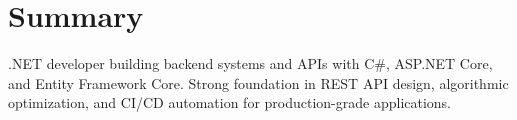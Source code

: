 \section{Summary}
.NET developer building backend systems and APIs with C\#, ASP.NET Core, and Entity Framework Core. Strong foundation in REST API design, algorithmic optimization, and CI/CD automation for production-grade applications.
